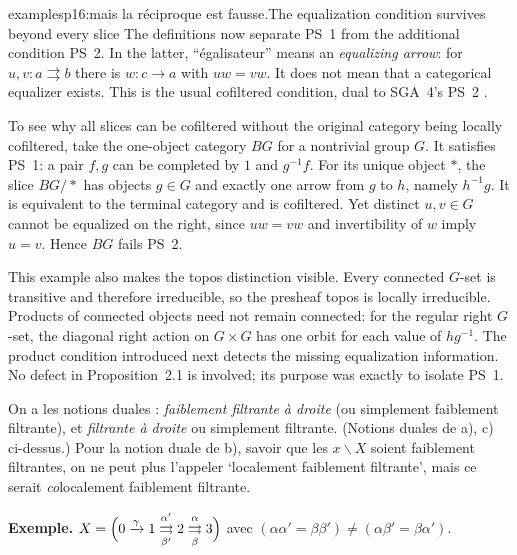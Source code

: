 \begin{dcomment}{examples}{p16:mais la réciproque est fausse.}{The equalization condition survives beyond every slice}
The definitions now separate PS~1 from the additional condition PS~2. In the latter, ``\'egalisateur'' means an \emph{equalizing arrow}: for $u,v:a\rightrightarrows b$ there is $w:c\to a$ with $uw=vw$. It does not mean that a categorical equalizer exists. This is the usual cofiltered condition, dual to SGA~4's PS~2 \citep[Expos\'e~I, \S2.7]{SGA4I1972}.

To see why all slices can be cofiltered without the original category being locally cofiltered, take the one-object category $BG$ for a nontrivial group $G$. It satisfies PS~1: a pair $f,g$ can be completed by $1$ and $g^{-1}f$. For its unique object $*$, the slice $BG/*$ has objects $g\in G$ and exactly one arrow from $g$ to $h$, namely $h^{-1}g$. It is equivalent to the terminal category and is cofiltered. Yet distinct $u,v\in G$ cannot be equalized on the right, since $uw=vw$ and invertibility of $w$ imply $u=v$. Hence $BG$ fails PS~2.

This example also makes the topos distinction visible. Every connected $G$-set is transitive and therefore irreducible, so the presheaf topos is locally irreducible. Products of connected objects need not remain connected: for the regular right $G$-set, the diagonal right action on $G\times G$ has one orbit for each value of $hg^{-1}$. The product condition introduced next detects the missing equalization information. No defect in Proposition~2.1 is involved; its purpose was exactly to isolate PS~1.
\end{dcomment}



\noindent On a les notions duales : \textit{faiblement filtrante à droite} (ou simplement faiblement filtrante), et \textit{filtrante à droite} ou simplement filtrante. (Notions duales de a), c) ci-dessus.) Pour la notion duale de b), savoir que les $x\backslash X$ soient faiblement filtrantes, on ne peut plus l'appeler `localement faiblement filtrante', mais ce serait \textit{co}localement faiblement filtrante.

\noindent\textbf{Exemple.} $X = \Bigl(0 \xrightarrow{\gamma} 1 \underset{\beta'}{\overset{\alpha'}{\rightrightarrows}} 2 \underset{\beta}{\overset{\alpha}{\rightrightarrows}} 3\Bigr)$ avec $(\alpha\alpha' = \beta\beta') \neq (\alpha\beta' = \beta\alpha')$.


